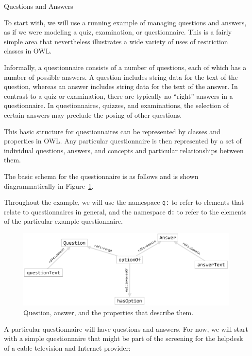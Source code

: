 \begin{example}{Questions and Answers}
\label{ex:ch12.1}

To start with, we will use a running example of managing questions and
answers, as if we were modeling a quiz, examination, or questionnaire.
This is a fairly simple area that nevertheless illustrates a wide
variety of uses of restriction classes in OWL.

Informally, a questionnaire consists of a number of questions, each of
which has a number of possible
answers. A question includes string data for the text of the question,
whereas an answer includes string data for the text of the answer. In
contrast to a quiz or examination, there are typically no ``right''
answers in a questionnaire. In questionnaires, quizzes, and
examinations, the selection of certain answers may preclude the posing
of other questions.

This basic structure for questionnaires can be represented by classes
and properties in OWL. Any
particular questionnaire is then represented by a set of individual
questions, answers, and concepts and particular relationships between
them.

The basic schema for the questionnaire is as follows and is shown
diagrammatically in Figure~\ref{fig:ch12.01}.

Throughout the example, we will use the namespace \texttt{q:} to refer to
elements that relate to questionnaires in general, and the namespace \texttt{d:}
to refer to the elements of the particular example questionnaire.

\begin{figure}
\centering
\includegraphics[width=5in]{SWWOv3/media/ch12/figure12-1.png}
\caption{Question, answer, and the properties that describe them.}
\label{fig:ch12.01}
\end{figure}



A particular questionnaire will have questions and answers. For now, we
will start with a simple questionnaire that might be part of the
screening for the helpdesk of a cable television and Internet provider:


\end{example}
